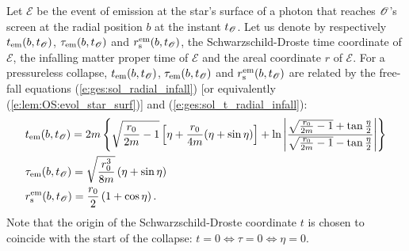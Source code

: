Let $\mathscr{E}$ be the event of emission at the star's surface of a photon that reaches
$\mathscr{O}$'s screen at the radial position $b$ at the instant $t_{\mathscr{O}}$.
Let us denote by respectively $t_{\rm em}(b,t_{\mathscr{O}})$,
$\tau_{\rm em}(b,t_{\mathscr{O}})$ and $r_{\rm s}^{\rm em}(b,t_{\mathscr{O}})$,
the Schwarzschild-Droste time
coordinate of $\mathscr{E}$, the infalling matter proper time of $\mathscr{E}$
and the areal coordinate $r$ of $\mathscr{E}$.
For a pressureless collapse,
$t_{\rm em}(b,t_{\mathscr{O}})$, $\tau_{\rm em}(b,t_{\mathscr{O}})$ and $r_{\rm s}^{\rm em}(b,t_{\mathscr{O}})$
are related by the free-fall equations (\ref{e:ges:sol_radial_infall}) [or
equivalently (\ref{e:lem:OS:evol_star_surf})] and (\ref{e:ges:sol_t_radial_infall}):
\begin{subequations}
\label{e:lem:OS:free_fall_em}
\begin{align}
   & t_{\rm em}(b,t_{\mathscr{O}}) = 2m \left\{ \sqrt{\frac{r_0}{2m} - 1} \left[ \eta + \frac{r_0}{4m}
    (\eta + \sin\eta) \right]
    + \ln \left| \frac{\sqrt{\frac{r_0}{2m} - 1} + \tan\frac{\eta}{2}}{\sqrt{\frac{r_0}{2m} - 1} - \tan\frac{\eta}{2}} \right| \right\} \\
    & \tau_{\rm em}(b,t_{\mathscr{O}}) =\sqrt{\frac{r_0^3}{8 m}}  \left( \eta + \sin\eta \right) \\
    & r_{\rm s}^{\rm em}(b,t_{\mathscr{O}}) = \frac{r_0}{2} \left( 1 + \cos\eta \right) .
\end{align}
\end{subequations}
Note that the origin of the Schwarzschild-Droste coordinate $t$ is chosen
to coincide with the start of the collapse: $t = 0 \iff \tau = 0 \iff \eta = 0$.

